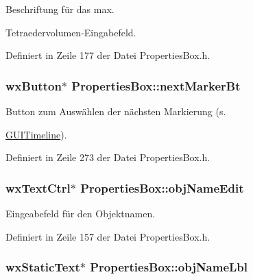 Beschriftung für das max. 

Tetraedervolumen-\/\-Eingabefeld. 

Definiert in Zeile 177 der Datei Properties\-Box.\-h.

\hypertarget{classPropertiesBox_ad4a347a273ab780cf1ab941a5cf6d4b0}{
\subsubsection[{next\-Marker\-Bt}]{\setlength{\rightskip}{0pt plus 5cm}wx\-Button$\ast$ Properties\-Box\-::next\-Marker\-Bt\hspace{0.3cm}{\ttfamily [private]}}}\label{classPropertiesBox_ad4a347a273ab780cf1ab941a5cf6d4b0}


Button zum Auswählen der nächsten Markierung (s. 

\hyperlink{classGUITimeline}{G\-U\-I\-Timeline}). 

Definiert in Zeile 273 der Datei Properties\-Box.\-h.

\hypertarget{classPropertiesBox_a7bb26289d5da39d7996c794216f4d89b}{
\subsubsection[{obj\-Name\-Edit}]{\setlength{\rightskip}{0pt plus 5cm}wx\-Text\-Ctrl$\ast$ Properties\-Box\-::obj\-Name\-Edit\hspace{0.3cm}{\ttfamily [private]}}}\label{classPropertiesBox_a7bb26289d5da39d7996c794216f4d89b}


Eingeabefeld für den Objektnamen. 



Definiert in Zeile 157 der Datei Properties\-Box.\-h.

\hypertarget{classPropertiesBox_ac281563a94d4cdffd51084d88cafc692}{
\subsubsection[{obj\-Name\-Lbl}]{\setlength{\rightskip}{0pt plus 5cm}wx\-Static\-Text$\ast$ Properties\-Box\-::obj\-Name\-Lbl\hspace{0.3cm}{\ttfamily [private]}}}\label{classPropertiesBox_ac281563a94d4cdffd51084d88cafc692}


